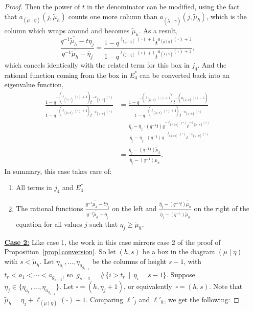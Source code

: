 \documentclass[ALCO]{cedram}
\newcommand{\mutilde}{{\widetilde{\mu}}}
\newcommand{\lambdatilde}{{\widetilde{\lambda}}}
\newcommand{\lambdatildegamma}{{(\lambdatilde \mid \gamma)}}
\newcommand{\mutildeeta}{{(\mutilde \mid \eta)}}
\newcommand{\leg}[1]{{\ell_{#1}(\square)}}
\newcommand{\armtwo}[1]{{a_{#1}(\square)}}
\newcommand{\jfour}{j_4}
\newcommand{\Estarfour}{E^*_4}
\newcommand{\lj}{\ell'_j}
\newcommand{\lh}{\ell'_h}
\begin{document}
\begin{proof}
Then the power of $t$ in the denominator can be modified, using the fact that $a_\mutildeeta(j,\mutilde_h)$ counts one more column than $a_\lambdatildegamma(j,\mutilde_h)$, which is the column which wraps around and becomes $\mutilde_h$. As a result,
\[ \frac{q^{-1} \overline{\mutilde_h} -t\overline{\eta}_j}{q^{-1} \overline{\mutilde_h} -\overline{\eta}_j} = \frac{1-q^{\leg{\mutildeeta}+1} t^{\armtwo{\mutildeeta}+1}}{1-q^{\leg{\mutildeeta}+1} t^{\armtwo{\lambdatildegamma}+1}},\]
which cancels identically with the related term for this box in $\jfour$. And the rational function coming from the box in $\Estarfour$ can be converted back into an eigenvalue function,
\begin{align*}
    \frac{1-q^{-(\leg{\lambdatildegamma}+1)} t^{-\armtwo{\lambdatildegamma}}}{1-q^{-(\leg{\mutildeeta}+1)} t^{-\armtwo{\mutildeeta}}} &= \frac{1-q^{-(\leg{\mutildeeta}+1)} t^{-(\armtwo{\mutildeeta}-1)}}{1-q^{-(\leg{\mutildeeta}+1)} t^{-\armtwo{\mutildeeta}}}\\
    &= \frac{\overline{\eta}_j-\overline{\eta}_j\cdot (q^{-1}t)q^{-\leg{\mutildeeta}} t^{-\armtwo{\mutildeeta}}}{\overline{\eta}_j-\overline{\eta}_j\cdot (q^{-1})q^{-\leg{\mutildeeta}} t^{-\armtwo{\mutildeeta}}}\\
    &=\frac{\overline{\eta}_j- (q^{-1}t)\overline{\mutilde}_h}{\overline{\eta}_j- (q^{-1})\overline{\mutilde}_h}.
\end{align*}
In summary, this case takes care of:
\begin{enumerate}
    \item All terms in $\jfour$ and $\Estarfour$
    \item The rational functions $\displaystyle{ \frac{q^{-1} \overline{\mutilde_h} -t\overline{\eta}_j}{q^{-1} \overline{\mutilde_h} -\overline{\eta}_j}}$ on the left and $\displaystyle{\frac{\overline{\eta}_j- (q^{-1}t)\overline{\mutilde}_h}{\overline{\eta}_j- (q^{-1})\overline{\mutilde}_h}}$ on the right of the equation for all values $j$ such that $\eta_j\geq \mutilde_h$.\\
\end{enumerate}

\underline{\textbf{Case 2:}} Like case 1, the work in this case mirrors case 2 of the proof of Proposition~\ref{prop1conversion}. So let $(h,s)$ be a box in the diagram $\mutildeeta$ with $s<\mutilde_h$. Let $\eta_{a_1},\dotsc,\eta_{a_{g_{s-1}}}$ be the columns of height $s-1$, with $t_r < a_1 < \dotsm < a_{g_{s-1}}$, so~\mbox{$g_{s-1} = \# \{ i > t_r \, \mid \, \eta_i = s-1\}$}. Suppose $\eta_j \in \{\eta_{a_1}, \dotsc, \eta_{a_{g_{s-1}}}\}$. Let $\square = (h,\eta_j+1)$, or equivalently~$\square = (h,s)$. Note that $\mutilde_h = \eta_j + \leg{\mutildeeta}+1$. Comparing $\lj$ and $\lh$, we get the following:


\end{proof}
\end{document}

